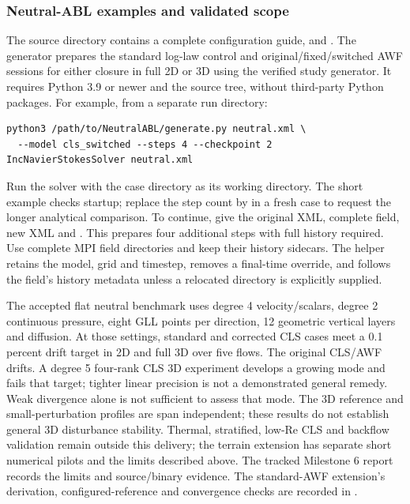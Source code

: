 \subsubsection{Neutral-ABL examples and validated scope}
The source directory
contains a complete configuration guide,  and
. The generator prepares the standard log-law control and
original/fixed/switched AWF sessions for either closure in full 2D or 3D using the
verified study generator. It requires Python 3.9 or newer and the source tree,
without third-party Python packages. For example, from a separate run directory:
\begin{lstlisting}[style=BashInputStyle]
python3 /path/to/NeutralABL/generate.py neutral.xml \
  --model cls_switched --steps 4 --checkpoint 2
IncNavierStokesSolver neutral.xml
\end{lstlisting}
Run the solver with the case directory as its working directory. The short
example checks startup; replace the step count by \inltt{--flow-times 5}
in a fresh case to request the longer analytical comparison. To continue,
give \inltt{restart.py} the original XML, complete field, new XML and
\inltt{--steps 4}. This prepares four additional steps with full history
required. Use complete MPI
field directories and keep their history sidecars. The helper retains the
model, grid and timestep, removes a final-time override, and follows the field's
history metadata unless a relocated directory is explicitly supplied.

The accepted flat neutral benchmark uses degree 4 velocity/scalars, degree 2
continuous pressure, eight GLL points per direction, 12 geometric vertical
layers and \inltt{HighRe} diffusion. At those settings, standard and corrected
CLS cases meet a 0.1 percent drift target in 2D and full 3D over five flows.
The original CLS/AWF drifts. A degree 5 four-rank CLS 3D experiment develops a growing
mode and fails that target; tighter linear precision is not a demonstrated
general remedy. Weak divergence alone is not sufficient to assess that mode.
The 3D reference and small-perturbation profiles are span independent; these
results do not establish general 3D disturbance stability. Thermal, stratified,
low-Re CLS and backflow validation remain outside this delivery; the terrain
extension has separate short numerical pilots and the limits described above.
The tracked Milestone 6 report records the limits and source/binary evidence.
The standard-AWF extension's derivation, configured-reference and convergence
checks are recorded in
.

